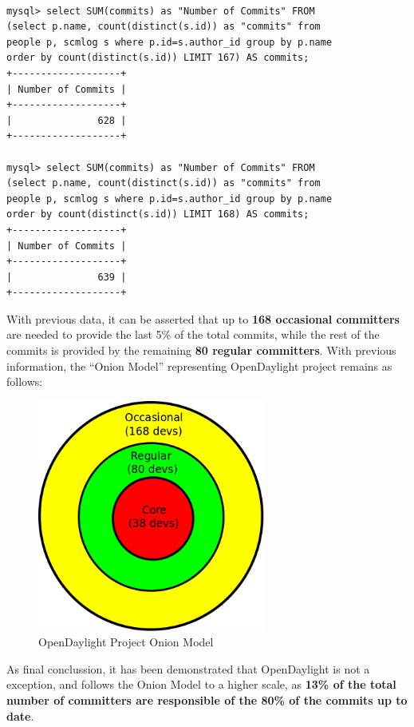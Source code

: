 \documentclass[a4paper, 12pt]{book}
\begin{document}
\begin{verbatim}

mysql> select SUM(commits) as "Number of Commits" FROM
(select p.name, count(distinct(s.id)) as "commits" from
people p, scmlog s where p.id=s.author_id group by p.name
order by count(distinct(s.id)) LIMIT 167) AS commits;
+-------------------+
| Number of Commits |
+-------------------+
|               628 |
+-------------------+

mysql> select SUM(commits) as "Number of Commits" FROM
(select p.name, count(distinct(s.id)) as "commits" from
people p, scmlog s where p.id=s.author_id group by p.name
order by count(distinct(s.id)) LIMIT 168) AS commits;
+-------------------+
| Number of Commits |
+-------------------+
|               639 |
+-------------------+

\end{verbatim}
With previous data, it can be asserted that up to \textbf{168 occasional committers} are needed to provide the last 5\% of the total commits, while the rest of the commits is provided by the remaining \textbf{80 regular committers}. With previous information, the ``Onion Model'' representing OpenDaylight project remains as follows:
\begin{center}
 \begin{figure}[H]
 \begin{center}
   \includegraphics[width=7.5cm]{img/onion01.png}
   \caption{OpenDaylight Project Onion Model}
   \label{fig:odl_onion_model}
 \end{center}
 \end{figure}
\end{center}
As final conclussion, it has been demonstrated that OpenDaylight is not a exception, and follows the Onion Model to a higher scale, as \textbf{13\% of the total number of committers are responsible of the 80\% of the commits up to date}.\\
\end{document}
